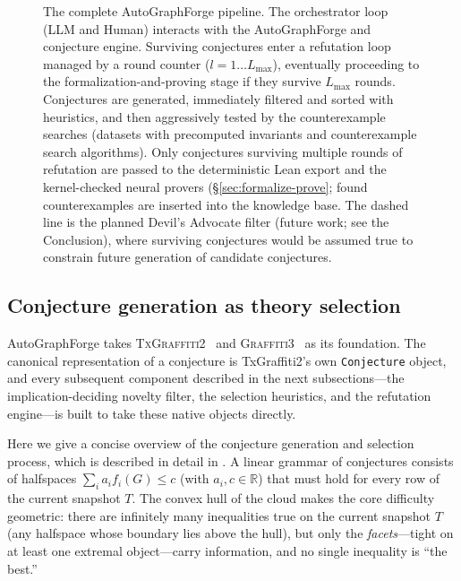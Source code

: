 \documentclass[]{ceurart}
\begin{document}
\begin{figure}[htbp]


    \caption{The complete AutoGraphForge pipeline. The orchestrator loop (LLM and Human) interacts with the AutoGraphForge and conjecture engine. Surviving conjectures enter a refutation loop managed by a round counter ($l = 1 \dots L_{\max}$), eventually proceeding to the formalization-and-proving stage if they survive $L_{\max}$ rounds. Conjectures are generated, immediately filtered and sorted with heuristics,
    and then aggressively tested by the counterexample searches (datasets with precomputed invariants and counterexample search algorithms). Only conjectures surviving
    multiple rounds of refutation are passed to the deterministic Lean export and the
    kernel-checked neural provers (\S\ref{sec:formalize-prove}; found
    counterexamples are inserted into the knowledge
    base. The dashed line is the planned Devil's Advocate filter (future work; see
    the Conclusion), where surviving
    conjectures would be assumed true to constrain future generation of candidate conjectures.}
    \label{fig:pipeline}
\end{figure}


\subsection{Conjecture generation as theory selection}
\label{sec:theory-selection}

\textsf{AutoGraphForge} takes \textsc{TxGraffiti2}~\cite{davila2024automated} and \textsc{Graffiti3}~\cite{davila2026graffiti3} as its foundation. The canonical representation of a
conjecture is TxGraffiti2's own \texttt{Conjecture} object, and every subsequent component described in the next subsections---the implication-deciding novelty filter, the
selection heuristics, and the refutation engine---is built to take these
native objects directly. 

Here we give a concise overview of the conjecture generation and selection process, which is described in detail in \cite{davila2024automated,davila2026graffiti3}.  A linear grammar of conjectures consists of halfspaces
$\sum_i a_i f_i(G)\le c$ (with $a_i, c \in \mathbb{R}$) that must hold for every row of the current snapshot $T$.
The convex hull of the cloud makes the core difficulty geometric: there are
infinitely many inequalities true on the current snapshot $T$ (any halfspace whose boundary lies
above the hull), but only the \emph{facets}---tight on at least one extremal
object---carry information, and no single inequality is ``the best.''  
\end{document}
